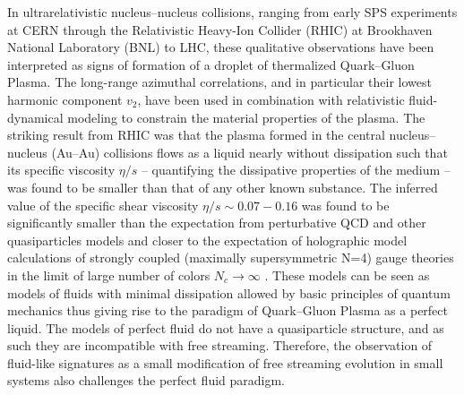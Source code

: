 \documentclass[../report.tex]{subfiles}
\begin{document}
In ultrarelativistic nucleus--nucleus collisions, ranging from early SPS experiments at CERN through the Relativistic Heavy-Ion Collider (RHIC) at Brookhaven National Laboratory (BNL) to LHC, these qualitative observations have been interpreted as signs of formation of a droplet of thermalized Quark--Gluon Plasma. The long-range azimuthal correlations, and in particular their lowest harmonic component $v_2$, have been used in combination with relativistic fluid-dynamical modeling to constrain the material properties of the plasma.  The striking result from RHIC was that the plasma formed in the central nucleus--nucleus (Au--Au) collisions flows as a liquid nearly without dissipation such that its specific viscosity $\eta/s$ -- quantifying the dissipative properties of the medium -- was found to be smaller than that of any other known substance. The inferred value of the specific shear viscosity $\eta/s\sim 0.07-0.16$  was found to be significantly smaller than the expectation from perturbative QCD and other quasiparticles models  and closer to the expectation of holographic model calculations of strongly coupled (maximally supersymmetric N=4) gauge theories in the limit of large number of colors $N_c \rightarrow \infty$ . These models can be seen as models of fluids with minimal dissipation allowed by basic principles of quantum mechanics thus giving rise to the paradigm of Quark--Gluon Plasma as a perfect liquid. The models of perfect fluid do not have a quasiparticle structure, and as such they are incompatible with free streaming. Therefore, the observation of fluid-like signatures as a small modification of free streaming evolution in small systems also challenges the perfect fluid paradigm. 
\end{document}
